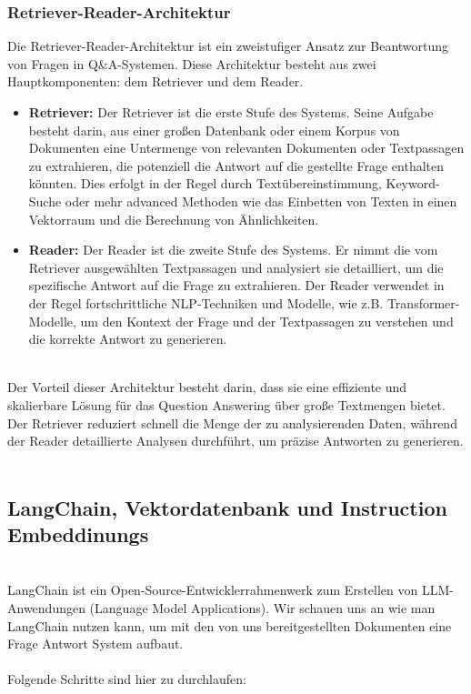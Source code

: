 \documentclass[12pt, a4paper]{article}
\begin{document}
\subsubsection{Retriever-Reader-Architektur}
Die Retriever-Reader-Architektur ist ein zweistufiger Ansatz zur Beantwortung von Fragen in Q\&A-Systemen. Diese Architektur besteht aus zwei Hauptkomponenten: dem Retriever und dem Reader.

\begin{itemize}
	\item \textbf{Retriever:} Der Retriever ist die erste Stufe des Systems. Seine Aufgabe besteht darin, aus einer großen Datenbank oder einem Korpus von Dokumenten eine Untermenge von relevanten Dokumenten oder Textpassagen zu extrahieren, die potenziell die Antwort auf die gestellte Frage enthalten könnten. Dies erfolgt in der Regel durch Textübereinstimmung, Keyword-Suche oder mehr advanced Methoden wie das Einbetten von Texten in einen Vektorraum und die Berechnung von Ähnlichkeiten.
	
	\item \textbf{Reader:} Der Reader ist die zweite Stufe des Systems. Er nimmt die vom Retriever ausgewählten Textpassagen und analysiert sie detailliert, um die spezifische Antwort auf die Frage zu extrahieren. Der Reader verwendet in der Regel fortschrittliche NLP-Techniken und Modelle, wie z.B. Transformer-Modelle, um den Kontext der Frage und der Textpassagen zu verstehen und die korrekte Antwort zu generieren.
\end{itemize}
\ \\
Der Vorteil dieser Architektur besteht darin, dass sie eine effiziente und skalierbare Lösung für das Question Answering über große Textmengen bietet. Der Retriever reduziert schnell die Menge der zu analysierenden Daten, während der Reader detaillierte Analysen durchführt, um präzise Antworten zu generieren.
\ \\
\subsection{LangChain, Vektordatenbank und Instruction Embeddinungs}
\ \\
LangChain ist ein Open-Source-Entwicklerrahmenwerk zum Erstellen von LLM-Anwendungen (Language Model Applications). Wir schauen uns an wie man LangChain nutzen kann, um mit den von uns bereitgestellten Dokumenten eine Frage Antwort System aufbaut.
\\ \\
Folgende Schritte sind hier zu durchlaufen:
\end{document}

